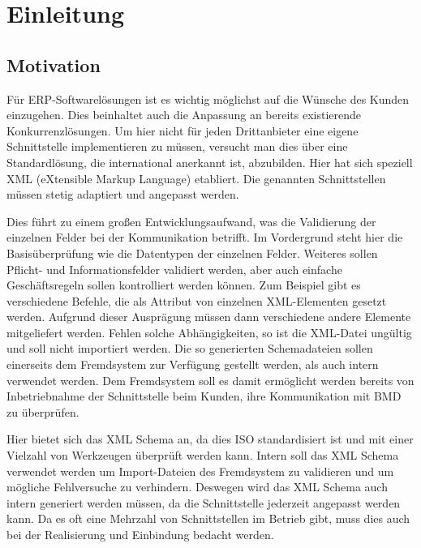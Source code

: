 \chapter{Einleitung}
\label{cha:Einleitung}

\section{Motivation}
Für ERP-Softwarelösungen ist es wichtig möglichst auf die Wünsche des Kunden einzugehen. Dies beinhaltet auch die Anpassung an bereits existierende Konkurrenzlösungen. 
Um hier nicht für jeden Drittanbieter eine eigene Schnittstelle implementieren zu müssen, versucht man dies über eine Standardlösung, die international anerkannt ist, abzubilden. Hier hat sich speziell XML (eXtensible Markup Language) etabliert. Die genannten Schnittstellen müssen stetig adaptiert und angepasst werden. 

Dies führt zu einem großen Entwicklungsaufwand, was die Validierung der einzelnen Felder bei der Kommunikation betrifft. 
Im Vordergrund steht hier die Basisüberprüfung wie die Datentypen der einzelnen Felder. Weiteres sollen Pflicht- und Informationsfelder validiert werden, aber auch einfache Geschäftsregeln sollen kontrolliert werden können. 
Zum Beispiel gibt es verschiedene Befehle, die als Attribut von einzelnen XML-Elementen gesetzt werden. Aufgrund dieser Ausprägung müssen dann verschiedene andere Elemente mitgeliefert werden. Fehlen solche Abhängigkeiten, so ist die XML-Datei ungültig und soll nicht importiert werden.
Die so generierten Schemadateien sollen einerseits dem Fremdsystem zur Verfügung gestellt werden, als auch intern verwendet werden. 
Dem Fremdsystem soll es damit ermöglicht werden bereits von Inbetriebnahme der Schnittstelle beim Kunden, ihre Kommunikation mit BMD zu überprüfen. 

Hier bietet sich das XML Schema an, da dies ISO standardisiert ist und mit einer Vielzahl von Werkzeugen überprüft werden kann. 
Intern soll das XML Schema verwendet werden um Import-Dateien des Fremdsystem zu validieren und  um mögliche Fehlversuche zu verhindern. Deswegen wird das XML Schema auch intern generiert werden müssen, da die Schnittstelle jederzeit angepasst werden kann.
Da es oft eine Mehrzahl von Schnittstellen im Betrieb gibt, muss dies auch bei der Realisierung und Einbindung bedacht werden.


